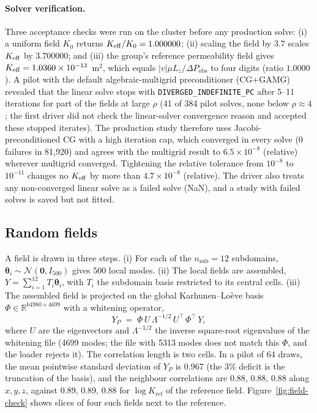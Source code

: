 \paragraph{Solver verification.}
Three acceptance checks were run on the cluster before any production solve: (i) a uniform field $K_0$ returns $K_{\mathrm{eff}}/K_0=1.000000$; (ii) scaling the field by $3.7$ scales $K_{\mathrm{eff}}$ by $3.700000$; and (iii) the group's reference permeability field gives $K_{\mathrm{eff}}=1.0360\times10^{-13}$~m$^2$, which equals $|v|\mu L_z/\Delta P_{\mathrm{obs}}$ to four digits (ratio $1.0000$). A pilot with the default algebraic-multigrid preconditioner (CG+GAMG) revealed that the linear solve stops with \texttt{DIVERGED\_INDEFINITE\_PC} after 5--11 iterations for part of the fields at large $\rho$ (41 of 384 pilot solves, none below $\rho\approx4$; the first driver did not check the linear-solver convergence reason and accepted these stopped iterates). The production study therefore uses Jacobi-preconditioned CG with a high iteration cap, which converged in every solve (0 failures in 81{,}920) and agrees with the multigrid result to $6.5\times10^{-8}$ (relative) wherever multigrid converged. Tightening the relative tolerance from $10^{-8}$ to $10^{-11}$ changes no $K_{\mathrm{eff}}$ by more than $4.7\times10^{-8}$ (relative). The driver also treats any non-converged linear solve as a failed solve (NaN), and a study with failed solves is saved but not fitted.

\subsection{Random fields}
\label{sec:fields}
A field is drawn in three steps. (i) For each of the $n_{\mathrm{sub}}=12$ subdomains, $\boldsymbol\theta_i\sim\mathcal N(\mathbf 0,I_{500})$ gives $500$ local modes. (ii) The local fields are assembled, $Y=\sum_{i=1}^{12}T_i\boldsymbol\theta_i$, with $T_i$ the subdomain basis restricted to its central cells. (iii) The assembled field is projected on the global Karhunen--Lo\`eve basis $\Phi\in\mathbb R^{64980\times4699}$ with a whitening operator,
\begin{equation}
  Y_P \;=\; \Phi\,U\,\Lambda^{-1/2}\,U^{\!\top}\,\Phi^{\!\top}\,Y,
  \label{eq:whiten}
\end{equation}
where $U$ are the eigenvectors and $\Lambda^{-1/2}$ the inverse square-root eigenvalues of the whitening file (4699 modes; the file with 5313 modes does not match this $\Phi$, and the loader rejects it). The correlation length is two cells. In a pilot of 64 draws, the mean pointwise standard deviation of $Y_P$ is $0.967$ (the $3\%$ deficit is the truncation of the basis), and the neighbour correlations are $0.88,\,0.88,\,0.88$ along $x,y,z$, against $0.89,\,0.89,\,0.88$ for $\log K_{\mathrm{ref}}$ of the reference field. Figure~\ref{fig:field-check} shows slices of four such fields next to the reference.

